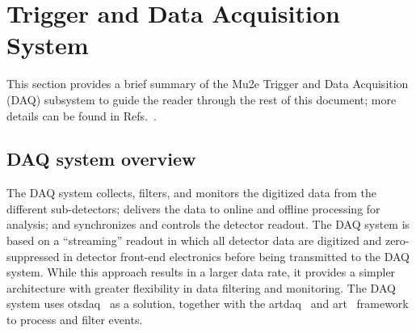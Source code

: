 \section{Trigger and Data Acquisition System} 
\label{sec:daq}

This section provides a brief summary of the Mu2e Trigger and Data Acquisition (DAQ) subsystem to guide the reader through the rest of this document; more details can be found in Refs.~\cite{Gioiosa:2020tig, Gioiosa:2022dah}. 

\subsection{DAQ system overview}
The DAQ system collects, filters, and monitors the digitized data from the different sub-detectors; delivers the data to online and offline processing for analysis; and synchronizes and controls the detector readout. The DAQ system is based on a “streaming” readout in which all detector data are digitized and zero-suppressed in detector front-end electronics before being transmitted to the DAQ system. While this approach results in a larger data rate, it provides a simpler architecture with greater flexibility in data filtering and monitoring. The DAQ system uses otsdaq~\cite{Biery:2018enl} as a solution, together with the artdaq~\cite{Gioiosa:2020tig} and art~\cite{Green:2012gv} framework to process and filter events. 

